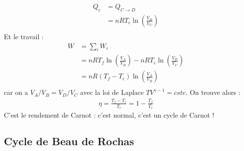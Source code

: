 \documentclass{report}
\begin{document}
\begin{itemize}
\begin{align*}
	Q_c&=Q_{C\rightarrow D}\\
	&=nRT_c\ln\left(\frac{V_D}{V_C} \right)\\
\end{align*}		
Et le travail :	
\begin{align*}
	W&=\sum_i W_i\\
	&=nRT_f\ln\left(\frac{V_A}{V_B} \right)-nRT_c\ln\left(\frac{V_D}{V_C} \right)\\
	&=nR(T_f - T_c)\ln\left(\frac{V_A}{V_B} \right)\\
\end{align*}		
car on a $V_A/V_B=V_D/V_C$ avec la loi de Laplace $TV^{\gamma-1}=cste$.
On trouve alors :
\begin{align*}
	\eta=\frac{T_f-T_c}{T_c}=1-\frac{T_f}{T_c}
\end{align*}
C'est le rendement de Carnot : c'est normal, c'est un cycle de Carnot !

\end{itemize}

\subsection*{Cycle de Beau de Rochas}
\end{document}
